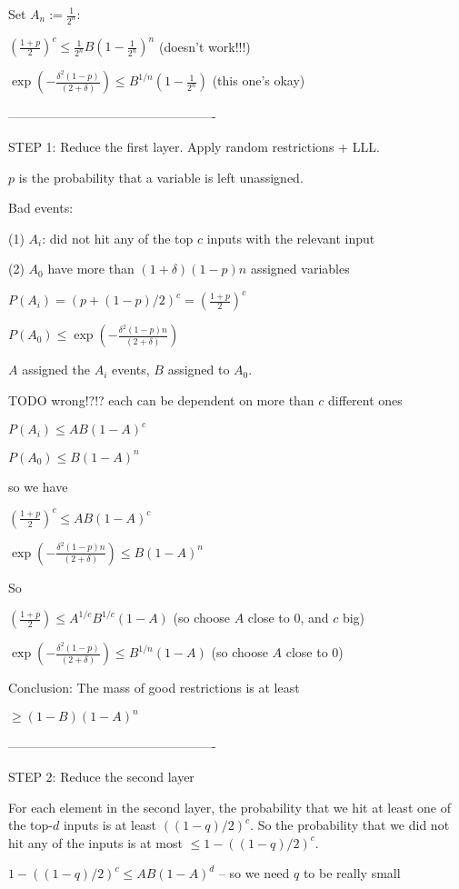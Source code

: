 \documentclass[11pt,a4paper]{article}
\begin{document}
Set $A_n := \frac{1}{2^n}$:


$\left(\frac{1+p}{2}\right)^c \leq \frac{1}{2^n} B (1-\frac{1}{2^n})^n$ (doesn't work!!!)

$ \exp(-\frac{\delta^2(1-p)}{(2+\delta)})  \leq B^{1/n} (1-\frac{1}{2^n})$ (this one's okay)


-------------------------------------------------


STEP 1: Reduce the first layer. Apply random restrictions + LLL.

$p$ is the probability that a variable is left unassigned.

Bad events:

(1) $A_i$: did not hit any of the top $c$ inputs with the relevant input

(2) $A_0$ have more than $(1+\delta)(1-p)n$ assigned variables

$P(A_i) = (p+(1-p)/2)^c = \left(\frac{1+p}{2}\right)^c$

$P(A_0) \leq \exp(-\frac{\delta^2(1-p)n}{(2+\delta)})$

$A$ assigned the $A_i$ events, $B$ assigned to $A_0$.

TODO wrong!?!? each can be dependent on more than $c$ different ones

$P(A_i) \leq A B (1-A)^c$

$P(A_0) \leq B (1-A)^n$

so we have

$\left(\frac{1+p}{2}\right)^c \leq A B (1-A)^c$

$ \exp(-\frac{\delta^2(1-p)n}{(2+\delta)})  \leq B (1-A)^n$

So 

$\left(\frac{1+p}{2}\right) \leq A^{1/c} B^{1/c} (1-A)$ (so choose $A$ close to $0$, and $c$ big)

$ \exp(-\frac{\delta^2(1-p)}{(2+\delta)})  \leq B^{1/n} (1-A)$ (so choose $A$ close to $0$)

Conclusion: The mass of good restrictions is at least

$\geq (1-B)(1-A)^n$

-------------------------------------------------

STEP 2: Reduce the second layer

For each element in the second layer, the probability that we hit at least one of the top-$d$ inputs is at least $((1-q)/2)^c$.
So the probability that we did not hit any of the inputs is at most $\leq 1-((1-q)/2)^c$.

$1-((1-q)/2)^c \leq AB(1-A)^d$ -- so we need $q$ to be really small
\end{document}
